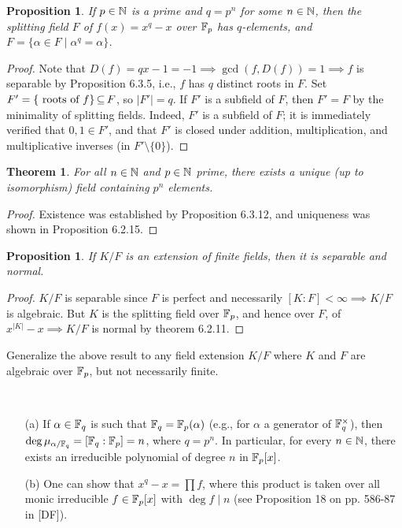 \documentclass[11pt]{book}
\newcounter{counter}
\newtheorem{theorem}[counter]{Theorem}   \newtheorem*{theorem*}{Theorem}   \newtheorem{lemma}[counter]{Lemma}   \newtheorem{corollary}[counter]{Corollary}
\newtheorem{proposition}[counter]{Proposition}   \newtheorem{problem}[counter]{Problem}   \newtheorem*{proposition*}{Proposition}   \newtheorem*{lemma*}{Lemma}
\theoremstyle{definition}   \newtheorem{defn}[counter]{Definition} %
\newcommand{\bs}{\setminus}   \newcommand{\A}{\mathcal{A}}   \newcommand{\sy}{\textnormal{Syl}}   \newcommand{\size}[1]{\left| #1 \right|}
\newcommand{\vs}{\vspace{8pt}}
\numberwithin{counter}{chapter}
\begin{document}
\vs

\begin{proposition}
If $p \in \operatorname{\mathbb{N}}$ is a prime and $q = p^n$ for some $n \in \operatorname{\mathbb{N}}$, then the splitting field $F$ of $f(x) = x^q - x$ over $\mathbb{F}_p$ has $q$-elements, and $F = \{\alpha \in F \mid \alpha^q = \alpha\}$. 
\end{proposition}

\begin{proof}
Note that $D(f) = qx - 1 = -1 \implies \gcd(f,D(f)) = 1 \implies f$ is separable by Proposition 6.3.5, i.e., $f$ has $q$ distinct roots in $F$. Set $F' = \{ \textnormal{ roots of } f\} \operatorname{\subseteq} F$, so $|F'| = q$. If $F'$ is a subfield of $F$, then $F' = F$ by the minimality of splitting fields. Indeed, $F'$ is a subfield of $F$; it is immediately verified that $0,1 \in F'$, and that $F'$ is closed under addition, multiplication, and multiplicative inverses (in $F' \bs \{0\}$). 
\end{proof}

\vs

\begin{theorem}
For all $n \in \operatorname{\mathbb{N}}$ and $p \in \operatorname{\mathbb{N}}$ prime, there exists a unique (up to isomorphism) field containing $p^n$ elements.
\end{theorem}

\begin{proof}
Existence was established by Proposition 6.3.12, and uniqueness was shown in Proposition 6.2.15. 
\end{proof}

\vs

\begin{proposition}
If $K/F$ is an extension of finite fields, then it is separable and normal. 
\end{proposition}

\begin{proof}
$K/F$ is separable since $F$ is perfect and necessarily $[K : F ] < \infty \implies K/F$ is algebraic. But $K$ is the splitting field over $\mathbb{F}_p$, and hence over $F$, of $x^{|K|}-x \implies K/F$ is normal by theorem 6.2.11. 
\end{proof}

\vs

\noindent {} Generalize the above result to any field extension $K/F$ where $K$ and $F$ are algebraic over $\mathbb{F}_p$, but not necessarily finite. 

\vs

\begin{remark}\ 
\begin{enumerate}
\item[(a)] If $\alpha \in \mathbb{F}_q$ is such that $\mathbb{F}_q = \mathbb{F}_p(\alpha)$ (e.g., for $\alpha$ a generator of $\mathbb{F}_q^{\times}$), then $\deg \mu_{\alpha/\mathbb{F}_q} = [\mathbb{F}_q : \mathbb{F}_p] = n$, where $q = p^n$. In particular, for every $n \in \operatorname{\mathbb{N}}$, there exists an irreducible polynomial of degree $n$ in $\mathbb{F}_p[x]$. 
\item[(b)] One can show that $x^q-x = \prod f$, where this product is taken over all monic irreducible $f \in \mathbb{F}_p[x]$ with $\deg f \mid n$ (see Proposition 18 on pp. 586-87 in [DF]). 
\end{enumerate}
\end{remark}
\end{document}
